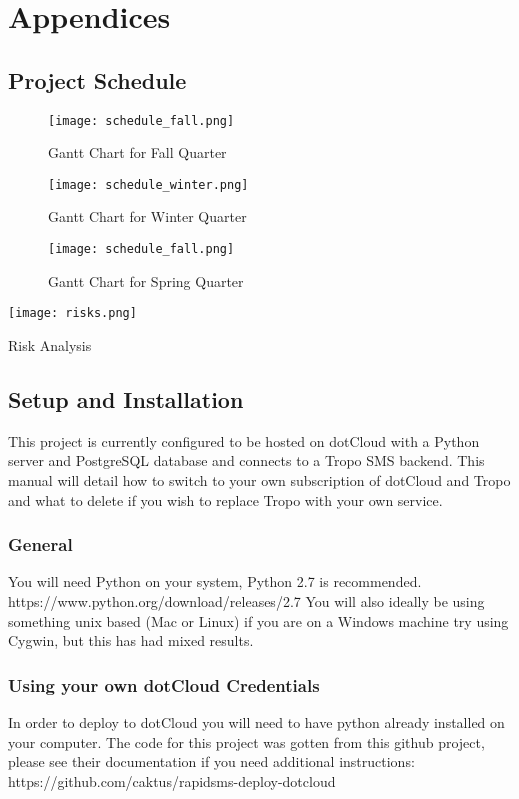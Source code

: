 \chapter{Appendices}

\section{Project Schedule}
\begin{figure}[H]
	\centering
	\texttt{[image: schedule\_fall.png]}
	\caption{Gantt Chart for Fall Quarter}
\end{figure}

\begin{figure}[H]
	\centering
	\texttt{[image: schedule\_winter.png]}
	\caption{Gantt Chart for Winter Quarter}
\end{figure}

\begin{figure}[H]
	\centering
	\texttt{[image: schedule\_fall.png]}
	\caption{Gantt Chart for Spring Quarter}
\end{figure}

\begin{table}[H]
	\centering
	\texttt{[image: risks.png]}
	\caption{Risk Analysis}
\end{table}


\section{Setup and Installation}
This project is currently configured to be hosted on dotCloud with a Python server and PostgreSQL database and connects to a Tropo SMS backend. This manual will detail how to switch to your own subscription of dotCloud and Tropo and what to delete if you wish to replace Tropo with your own service.

\subsection*{General}
You will need Python on your system, Python 2.7 is recommended. https://www.python.org/download/releases/2.7
You will also ideally be using something unix based (Mac or Linux) if you are on a Windows machine try using Cygwin, but this has had mixed results.

\subsection*{Using your own dotCloud Credentials}
In order to deploy to dotCloud you will need to have python already installed on your computer. The code for this project was gotten from this github project, please see their documentation if you need additional instructions: https://github.com/caktus/rapidsms-deploy-dotcloud


